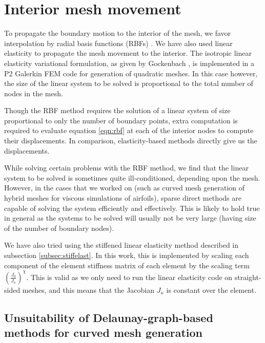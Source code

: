 \section{Interior mesh movement}

To propagate the boundary motion to the interior of the mesh, we favor interpolation by radial basis functions (RBFs) \cite{mm:rbf}. We have also used linear elasticity to propagate the mesh movement to the interior. The isotropic linear elasticity variational formulation, as given by Gockenbach \cite{gockenbach}, is implemented in a P2 Galerkin FEM code for generation of quadratic meshes. In this case however, the size of the linear system to be solved is proportional to the total number of nodes in the mesh.

Though the RBF method requires the solution of a linear system of size proportional to only the number of boundary points, extra computation is required to evaluate equation \eqref{eqn:rbf} at each of the interior nodes to compute their displacements. In comparison, elasticity-based methods directly give us the displacements. 

While solving certain problems with the RBF method, we find that the linear system to be solved is sometimes quite ill-conditioned, depending upon the mesh. However, in the cases that we worked on (such as curved mesh generation of hybrid meshes for viscous simulations of airfoils), sparse direct methods are capable of solving the system efficiently and effectively. This is likely to hold true in general as the systems to be solved will usually not be very large (having size of the number of boundary nodes).

We have also tried using the stiffened linear elasticity method described in subsection \ref{subsec:stiffelast}. In this work, this is implemented by scaling each component of the element stiffness matrix of each element by the scaling term $\left(\frac{J_0}{J_\kappa}\right)^\chi$. This is valid as we only need to run the linear elasticity code on straight-sided meshes, and this means that the Jacobian $J_\kappa$ is constant over the element.

\subsection{Unsuitability of Delaunay-graph-based methods for curved mesh generation}
\label{subsec:dgmunsuitable}


